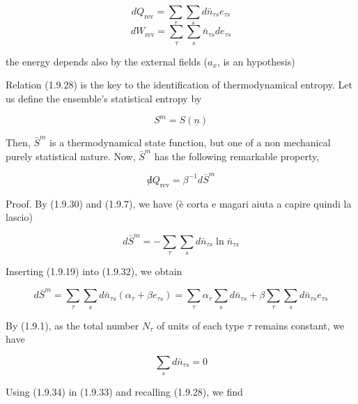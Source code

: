 \documentclass{article}
\begin{document}
\begin{equation}
 d Q_{\mathrm{rev}}=\sum_{\tau} \sum_{s} d \bar{n}_{\tau s} e_{\tau s}  \tag{1.9.28} 
 \end{equation}
 \begin{equation}
 d W_{\mathrm{rev}}=\sum_{\tau} \sum_{s} \bar{n}_{\tau s} d e_{\tau s} \tag{1.9.29} 
\end{equation}

the energy depends also by the external fields ($a_x$, is an hypothesis)

Relation (1.9.28) is the key to the identification of thermodynamical entropy.
Let us define the ensemble's statistical entropy by
 
\begin{equation*}
S^{m}=S(\underline{n}) \tag{1.9.30}
\end{equation*}
 

Then, $\bar{S}^{m}$ is a thermodynamical state function, but one of a non mechanical purely statistical nature. Now, $\bar{S}^{m}$ has the following remarkable property,
 
\begin{equation*}
\not d Q_{\mathrm{rev}}=\beta^{-1} d \bar{S}^{m} \tag{1.9.31}
\end{equation*}
 

Proof. By (1.9.30) and (1.9.7), we have (è corta e magari aiuta a capire quindi la lascio)
 
\begin{equation*}
d \bar{S}^{m}=-\sum_{\tau} \sum_{s} d \bar{n}_{\tau s} \ln \bar{n}_{\tau s} \tag{1.9.32}
\end{equation*}
 

Inserting (1.9.19) into (1.9.32), we obtain
 
\begin{equation*}
d \bar{S}^{m}=\sum_{\tau} \sum_{s} d \bar{n}_{\tau s}\left(\alpha_{\tau}+\beta e_{\tau s}\right)=\sum_{\tau} \alpha_{\tau} \sum_{s} d \bar{n}_{\tau s}+\beta \sum_{\tau} \sum_{s} d \bar{n}_{\tau s} e_{\tau s} \tag{1.9.33}
\end{equation*}
 

By (1.9.1), as the total number $N_{\tau}$ of units of each type $\tau$ remains constant, we have
 
\begin{equation*}
\sum_{s} d \bar{n}_{\tau s}=0 \tag{1.9.34}
\end{equation*}
 

Using (1.9.34) in (1.9.33) and recalling (1.9.28), we find
 
\end{document}
